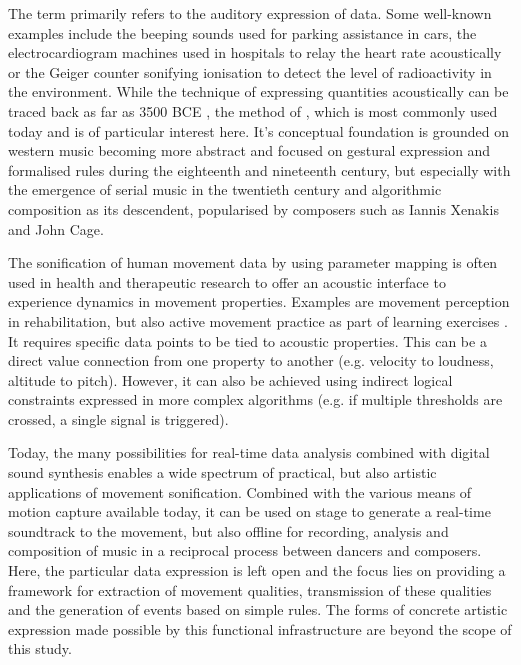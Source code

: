 The term  primarily refers to the auditory expression of data. Some well-known examples include the beeping sounds used for parking assistance in cars, the electrocardiogram machines used in hospitals to relay the heart rate acoustically or the Geiger counter sonifying ionisation to detect the level of radioactivity in the environment. While the technique of expressing quantities acoustically can be traced back as far as 3500 BCE \parencite[178]{sonificationPreHistory}, the method of  \parencite[Chapter~15]{sonificationHandbook}, which is most commonly used today and is of particular interest here. It's conceptual foundation is grounded on western music becoming more abstract and focused on gestural expression and formalised rules during the eighteenth and nineteenth century, but especially with the emergence of serial music in the twentieth century \parencite[179-180]{sonificationPreHistory} and algorithmic composition as its descendent, popularised by composers such as Iannis Xenakis and John Cage.

The sonification of human movement data by using parameter mapping is often used in health and therapeutic research to offer an acoustic interface to experience dynamics in movement properties. Examples are movement perception in rehabilitation, but also active movement practice as part of learning exercises \parencite[see][]{ifMotionSounds}. It requires specific data points to be tied to acoustic properties. This can be a direct value connection from one property to another (e.g. velocity to loudness, altitude to pitch). However, it can also be achieved using indirect logical constraints expressed in more complex algorithms (e.g. if multiple thresholds are crossed, a single signal is triggered).

Today, the many possibilities for real-time data analysis combined with digital sound synthesis enables a wide spectrum of practical, but also artistic applications of movement sonification. Combined with the various means of motion capture available today, it can be used on stage to generate a real-time soundtrack to the movement, but also offline for recording, analysis and composition of music in a reciprocal process between dancers and composers. Here, the particular data expression is left open and the focus lies on providing a framework for extraction of movement qualities, transmission of these qualities and the generation of events based on simple rules. The forms of concrete artistic expression made possible by this functional infrastructure are beyond the scope of this study.

